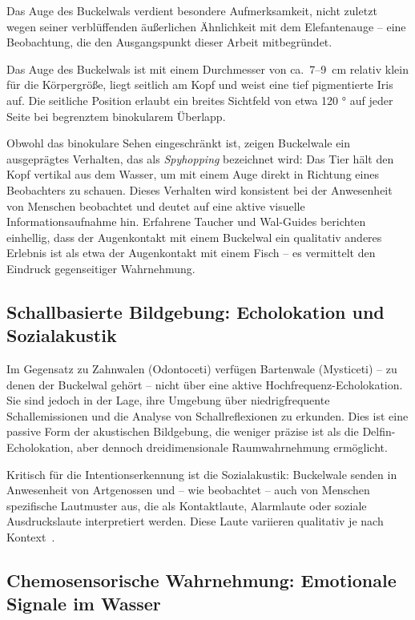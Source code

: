 ﻿\documentclass[12pt,a4paper]{article}
\theoremstyle{definition}
\theoremstyle{remark}
\begin{document}
Das Auge des Buckelwals verdient besondere Aufmerksamkeit, nicht zuletzt wegen
seiner verblüffenden äußerlichen Ähnlichkeit mit dem Elefantenauge -- eine
Beobachtung, die den Ausgangspunkt dieser Arbeit mitbegründet.

Das Auge des Buckelwals ist mit einem Durchmesser von ca.\ 7--9~cm relativ klein
für die Körpergröße, liegt seitlich am Kopf und weist eine tief pigmentierte
Iris auf. Die seitliche Position erlaubt ein breites Sichtfeld von etwa 120 °
auf jeder Seite bei begrenztem binokularem Überlapp.

Obwohl das binokulare Sehen eingeschränkt ist, zeigen Buckelwale ein
ausgeprägtes Verhalten, das als \emph{Spyhopping} bezeichnet wird: Das
Tier hält den Kopf vertikal aus dem Wasser, um mit einem Auge direkt in
Richtung eines Beobachters zu schauen. Dieses Verhalten wird konsistent bei
der Anwesenheit von Menschen beobachtet und deutet auf eine aktive visuelle
Informationsaufnahme hin. Erfahrene Taucher und Wal-Guides berichten
einhellig, dass der Augenkontakt mit einem Buckelwal ein qualitativ anderes
Erlebnis ist als etwa der Augenkontakt mit einem Fisch -- es vermittelt den
Eindruck gegenseitiger Wahrnehmung.

\subsection{Schallbasierte Bildgebung: Echolokation und Sozialakustik}

Im Gegensatz zu Zahnwalen (Odontoceti) verfügen Bartenwale (Mysticeti) --
zu denen der Buckelwal gehört -- nicht über eine aktive Hochfrequenz-Echolokation.
Sie sind jedoch in der Lage, ihre Umgebung über niedrigfrequente Schallemissionen
und die Analyse von Schallreflexionen zu erkunden. Dies ist eine passive Form
der akustischen Bildgebung, die weniger präzise ist als die Delfin-Echolokation,
aber dennoch dreidimensionale Raumwahrnehmung ermöglicht.

Kritisch für die Intentionserkennung ist die Sozialakustik: Buckelwale senden
in Anwesenheit von Artgenossen und -- wie beobachtet -- auch von Menschen
spezifische Lautmuster aus, die als Kontaktlaute, Alarmlaute oder soziale
Ausdruckslaute interpretiert werden. Diese Laute variieren qualitativ je nach
Kontext~\cite{dunlop2008social}.

\subsection{Chemosensorische Wahrnehmung: Emotionale Signale im Wasser}
\end{document}
